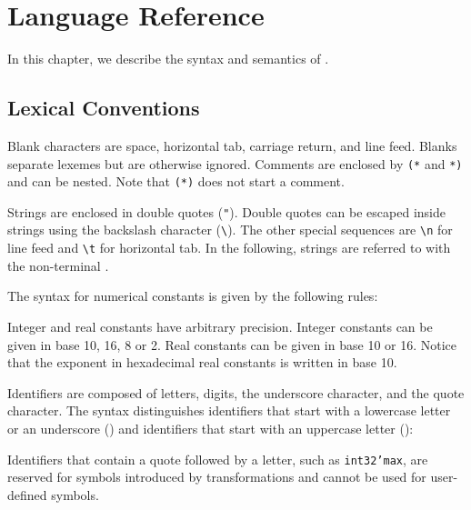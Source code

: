 \chapter{Language Reference}
\label{chap:syntaxref}

In this chapter, we describe the syntax and semantics of \whyml.

\section{Lexical Conventions}
\label{sec:lexer}

%
Blank characters are space, horizontal tab, carriage return,
and line feed. Blanks separate lexemes but are otherwise ignored.
%
Comments are enclosed by \texttt{(*} and \texttt{*)} and can be nested.
Note that \texttt{(*)} does not start a comment.

Strings are enclosed in double quotes (\verb!"!). Double quotes can be
escaped inside strings using the backslash character (\verb!\!).
The other special sequences are \verb!\n! for line feed and \verb!\t!
for horizontal tab.
In the following, strings are referred to with the non-terminal
\spacefalse.

The syntax for numerical constants is given by the following rules:
\begin{center}\end{center}
Integer and real constants have arbitrary precision.
Integer constants can be given in base 10, 16, 8 or 2.
Real constants can be given in base 10 or 16.
Notice that the exponent in hexadecimal real constants is written in base 10.

Identifiers are composed of letters, digits, the underscore character,
and the quote character. %
The syntax distinguishes identifiers that start with a lowercase letter
or an underscore (\spacefalse) and identifiers that
start with an uppercase letter (\spacefalse):
\begin{center}\end{center}
Identifiers that contain a quote followed by a letter,
such as \texttt{int32'max}, are reserved for symbols
introduced by \why transformations and cannot be used
for user-defined symbols.

